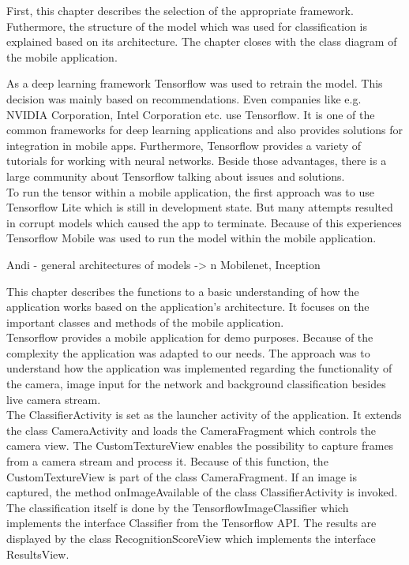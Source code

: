 First, this chapter describes the selection of the appropriate framework. Futhermore, the structure of the model which was used for classification is explained based on its architecture. The chapter closes with the class diagram of the mobile application.

As a deep learning framework Tensorflow was used to retrain the model. This decision was mainly based on recommendations. Even companies like e.g. NVIDIA Corporation, Intel Corporation etc. use Tensorflow. It is one of the common frameworks for deep learning applications and also provides solutions for integration in mobile apps. Furthermore, Tensorflow provides a variety of tutorials for working with neural networks. Beside those advantages, there is a large community about Tensorflow talking about issues and solutions. \\

To run the tensor within a mobile application, the first approach was to use Tensorflow Lite which is still in development state. But many attempts resulted in corrupt models which caused the app to terminate. Because of this experiences Tensorflow Mobile was used to run the model within the mobile application. 
		
	 Andi
	 - general architectures of models -> n Mobilenet, Inception
	 
This chapter describes the functions to a basic understanding of how the application works based on the application's architecture. It focuses on the important classes and methods of the mobile application. \\
Tensorflow provides a mobile application for demo purposes. Because of the complexity the application was adapted to our needs. The approach was to understand how the application was implemented regarding the functionality of the camera, image input for the network and background classification besides live camera stream. \\

The ClassifierActivity is set as the launcher activity of the application. It extends the class CameraActivity and loads the CameraFragment which controls the camera view. The CustomTextureView enables the possibility to capture frames from a camera stream and process it. Because of this function, the CustomTextureView is part of the class CameraFragment. If an image is captured, the method onImageAvailable of the class ClassifierActivity is invoked. The classification itself is done by the TensorflowImageClassifier which implements the interface Classifier from the Tensorflow API. The results are displayed by the class RecognitionScoreView which implements the interface ResultsView.